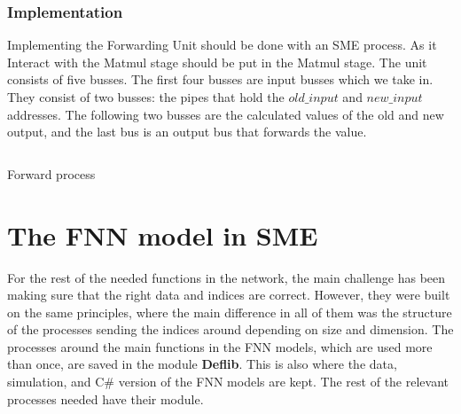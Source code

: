 \subsubsection*{Implementation}
Implementing the Forwarding Unit should be done with an SME process. As it
Interact with the Matmul stage should be put in the Matmul stage.
The unit consists of five busses.
The first four busses are input busses which we take in. They consist of two busses: the pipes that hold the $old\_input$ and $new\_input$ addresses. The following two busses are the calculated values of the old and new output, and the last bus is an output bus that forwards the value.


\begin{listing}
  \inputminted{csharp}{codesnippets/forward.cs}
  \caption{Forward process}
  \label{lst:forward}
\end{listing}


\section{The FNN model in SME}
For the rest of the needed functions in the network, the main challenge has been making sure that the right data and indices are correct.
However, they were built on the same principles, where the main difference in all of them was the structure of the processes sending the indices
around depending on size and dimension. 
The processes around the main functions in the FNN models, which are used more than once, are saved in the module \textbf{Deflib}. This is also where the data, simulation, and C\# version of the FNN models are kept. The rest of the relevant processes needed have their module.

